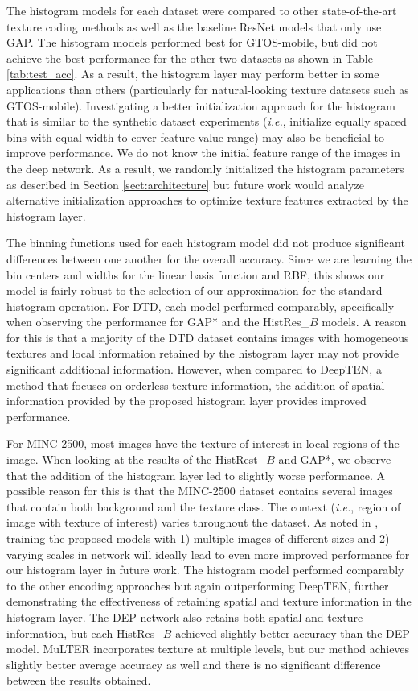 \documentclass[journal]{IEEEtai}
\begin{document}
	The histogram models for each dataset were compared to other state-of-the-art texture coding methods as well as the baseline ResNet models that only use GAP. The histogram models performed best for GTOS-mobile, but did not achieve the best performance for the other two datasets as shown in Table \mbox{\ref{tab:test_acc}}. As a result, the histogram layer may perform better in some applications than others (particularly for natural-looking texture datasets such as GTOS-mobile). Investigating a better initialization approach for the histogram that is similar to the synthetic dataset experiments (\textit{i.e.}, initialize equally spaced bins with equal width to cover feature value range) may also be beneficial to improve performance. We do not know the initial feature range of the images in the deep network. As a result, we randomly initialized the histogram parameters as described in Section \mbox{\ref{sect:architecture}} but future work would analyze alternative initialization approaches to optimize texture features extracted by the histogram layer.
	
	The binning functions used for each histogram model did not produce significant differences between one another for the overall accuracy. Since we are learning the bin centers and widths for the linear basis function and RBF, this shows our model is fairly robust to the selection of our approximation for the standard histogram operation. For DTD, each model performed comparably, specifically when observing the performance for GAP* and the HistRes\_$B$ models. A reason for this is that a majority of the DTD dataset contains images with homogeneous textures and local information retained by the histogram layer may not provide significant additional information. However, when compared to DeepTEN, a method that focuses on orderless texture information, the addition of spatial information provided by the proposed histogram layer provides improved performance. 
	
	For MINC-2500, most images have the texture of interest in local regions of the image. When looking at the results of the HistRest\_$B$ and GAP*, we observe that the addition of the histogram layer led to slightly worse performance. A possible reason for this is that the MINC-2500 dataset contains several images that contain both background and the texture class. The context (\textit{i.e.}, region of image with texture of interest) varies throughout the dataset. As noted in \mbox{\cite{hu2019multi,xue2018deep,zhang2017deep}}, training the proposed models with 1) multiple images of different sizes and 2) varying scales in network will ideally lead to even more improved performance for our histogram layer in future work. The histogram model performed comparably to the other encoding approaches but again outperforming DeepTEN, further demonstrating the effectiveness of retaining spatial and texture information in the histogram layer. The DEP network also retains both spatial and texture information, but each HistRes\_$B$ achieved slightly better accuracy than the DEP model. MuLTER \cite{hu2019multi} incorporates texture at multiple levels, but our method achieves slightly better average accuracy as well and there is no significant difference between the results obtained.
	
\end{document}
